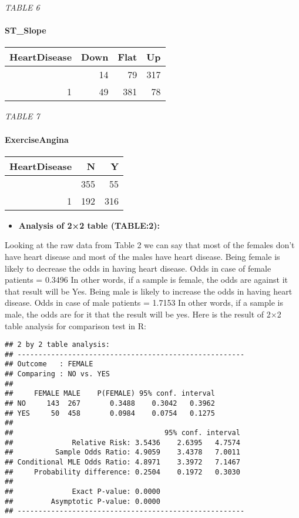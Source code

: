 \documentclass[
]{article}
\providecommand{\tightlist}{%
  \setlength{\itemsep}{0pt}\setlength{\parskip}{0pt}}
\begin{document}
\emph{TABLE 6}

\hypertarget{st_slope}{%
\paragraph{ST\_Slope}\label{st_slope}}

\begin{longtable}[]{@{}rrrr@{}}
\toprule\noalign{}
HeartDisease & Down & Flat & Up \\
\midrule\noalign{}
\endhead
\bottomrule\noalign{}
\endlastfoot
0 & 14 & 79 & 317 \\
1 & 49 & 381 & 78 \\
\end{longtable}

\emph{TABLE 7}

\hypertarget{exerciseangina}{%
\paragraph{ExerciseAngina}\label{exerciseangina}}

\begin{longtable}[]{@{}rrr@{}}
\toprule\noalign{}
HeartDisease & N & Y \\
\midrule\noalign{}
\endhead
\bottomrule\noalign{}
\endlastfoot
0 & 355 & 55 \\
1 & 192 & 316 \\
\end{longtable}

\begin{itemize}
\tightlist
\item
  \textbf{Analysis of 2×2 table (TABLE:2):}
\end{itemize}

Looking at the raw data from Table 2 we can say that most of the females
don't have heart disease and most of the males have heart disease. Being
female is likely to decrease the odds in having heart disease. Odds in
case of female patients = 0.3496 In other words, if a sample is female,
the odds are against it that result will be Yes. Being male is likely to
increase the odds in having heart disease. Odds in case of male patients
= 1.7153 In other words, if a sample is male, the odds are for it that
the result will be yes. Here is the result of 2×2 table analysis for
comparison test in R:

\begin{verbatim}
## 2 by 2 table analysis: 
## ------------------------------------------------------ 
## Outcome   : FEMALE 
## Comparing : NO vs. YES 
## 
##     FEMALE MALE    P(FEMALE) 95% conf. interval
## NO     143  267       0.3488    0.3042   0.3962
## YES     50  458       0.0984    0.0754   0.1275
## 
##                                    95% conf. interval
##              Relative Risk: 3.5436    2.6395   4.7574
##          Sample Odds Ratio: 4.9059    3.4378   7.0011
## Conditional MLE Odds Ratio: 4.8971    3.3972   7.1467
##     Probability difference: 0.2504    0.1972   0.3030
## 
##              Exact P-value: 0.0000 
##         Asymptotic P-value: 0.0000 
## ------------------------------------------------------
\end{verbatim}
\end{document}
